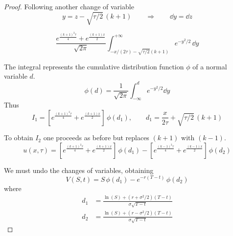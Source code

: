 \begin{proof}
    Following another change of variable
    \begin{equation*}
        y = z - \sqrt{\tau / 2}\,(k+1) 
        \qquad \Longrightarrow \qquad 
        \dd{y} = \dd{z}
    \end{equation*}

    \begin{equation*}
       \frac{e^{\tfrac{(k+1)^2 \tau}{4}} + e^{\tfrac{(k+1)x}{2}}}{\sqrt{2\pi}} \int_{-x/(2\tau) - \sqrt{\tau / 2} (k+1)}^{+\infty} e^{-y^2/2}\,\dd{y}
    \end{equation*}
    
    The integral represents the cumulative distribution function $\phi$ of a normal variable $d$.
    \begin{equation*}
        \phi(d) = \frac{1}{\sqrt{2\pi}} \int_{-\infty}^{d} e^{-y^2/2} \dd{y}
    \end{equation*}
    Thus
    \begin{equation*}
        I_1 = \left[e^{\tfrac{(k+1)^2 \tau}{4}} + e^{\tfrac{(k+1)x}{2}}\right] \, \phi(d_1),
        \qquad 
        d_1 = \frac{x}{2\tau} + \sqrt{\tau / 2}\,(k+1)
    \end{equation*}
    
    To obtain $I_2$ one proceeds as before but replaces $(k+1)$ with $(k-1)$.
    \begin{equation*}
        u(x,\tau) = \left[ e^{\tfrac{(k+1)^2 \tau}{4}} + e^{\tfrac{(k+1)x}{2}}\right] \, \phi(d_1) - \left[e^{\tfrac{(k-1)^2 \tau}{4}} + e^{\tfrac{(k-1)x}{2}}\right] \, \phi(d_2)
    \end{equation*}
    
    We must undo the changes of variables, obtaining
    \begin{equation*}
        V(S,t) = S\,\phi(d_1) - e^{-r(T-t)}\,\phi(d_2)
    \end{equation*}
    where
    \begin{align*}
        d_1 &= \frac{\ln(S) + \left(r + \sigma^2 / 2 \right)(T - t)}{\sigma \sqrt{T - t}} \\
        d_2 &= \frac{\ln(S) + \left(r - \sigma^2 / 2\right)(T - t)}{\sigma \sqrt{T - t}}
    \end{align*}

\end{proof}